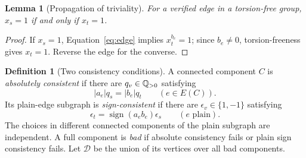 \documentclass[11pt]{article}
\newtheorem{lemma}[theorem]{Lemma}
\theoremstyle{definition}\newtheorem{definition}[theorem]{Definition}
\theoremstyle{remark}\newtheorem{remark}[theorem]{Remark}
\newcommand{\dead}{\mathcal D}
\begin{document}
\begin{lemma}[Propagation of triviality]\label{lem:propagate}
For a verified edge in a torsion-free group, $x_s=1$ if and only if $x_t=1$.
\end{lemma}
\begin{proof}
If $x_s=1$, Equation~\eqref{eq:edge} implies $x_t^{b_e}=1$; since
$b_e\ne0$, torsion-freeness gives $x_t=1$. Reverse the edge for the converse.
\end{proof}

\begin{definition}[Two consistency conditions]\label{def:consistency}
A connected component $C$ is \emph{absolutely consistent} if there are
$q_v\in\mathbb Q_{>0}$ satisfying
\begin{equation}\label{eq:abs}
 |a_e|q_s=|b_e|q_t \qquad(e\in E(C)).
\end{equation}
Its plain-edge subgraph is \emph{sign-consistent} if there are
$\epsilon_v\in\{1,-1\}$ satisfying
\begin{equation}\label{eq:sign}
 \epsilon_t=\operatorname{sign}(a_eb_e)\epsilon_s
 \qquad(e\text{ plain}).
\end{equation}
The choices in different connected components of the plain subgraph are
independent. A full component is \emph{bad} if absolute consistency fails
or plain sign consistency fails. Let $\dead$ be the union of its vertices
over all bad components.
\end{definition}
\end{document}
